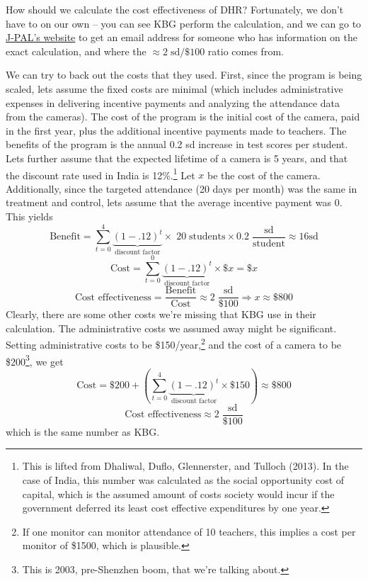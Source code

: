 \documentclass[12pt,english]{article}
\begin{document}
How should we calculate the cost effectiveness of DHR? Fortunately, we don't have to on our own -- you can see KBG perform the calculation, and we can go to \href{https://www.povertyactionlab.org/policy-lessons/cost-effectiveness}{J-PAL's website} to get an email address for someone who has information on the exact calculation, and where the $\approx 2\;\text{sd}/\$100$ ratio comes from.

We can try to back out the costs that they used. First, since the program is being scaled, lets assume the fixed costs are minimal (which includes administrative expenses in delivering incentive payments and analyzing the attendance data from the cameras). The cost of the program is the initial cost of the camera, paid in the first year, plus the additional incentive payments made to teachers. The benefits of the program is the annual 0.2 sd increase in test scores per student. Lets further assume that the expected lifetime of a camera is 5 years, and that the discount rate used in India is 12\%.\footnote{This is lifted from Dhaliwal, Duflo, Glennerster, and Tulloch (2013). In the case of India, this number was calculated as the social opportunity cost of capital, which is the assumed amount of costs society would incur if the government deferred its least cost effective expenditures by one year.} Let $x$ be the cost of the camera. Additionally, since the targeted attendance (20 days per month) was the same in treatment and control, lets assume that the average incentive payment was 0. This yields
$$ \text{Benefit} = \sum_{t = 0}^{4} \underbrace{(1 - .12)^{t} }_{\text{discount factor}} \times \; 20 \; \text{students} \times 0.2 \; \frac{\text{sd}}{\text{student}} \approx 16 \text{sd} $$
$$ \text{Cost} = \sum_{t = 0}^{0} \underbrace{(1 - .12)^{t} }_{\text{discount factor}} \times \$ x = \$ x $$
$$ \text{Cost effectiveness} = \frac{\text{Benefit}}{\text{Cost}} \approx 2 \; \frac{\text{sd}}{\$100} \Rightarrow x \approx \$ 800 $$
Clearly, there are some other costs we're missing that KBG use in their calculation. The administrative costs we assumed away might be significant. Setting administrative costs to be \$150/year,\footnote{If one monitor can monitor attendance of 10 teachers, this implies a cost per monitor of \$1500, which is plausible.} and the cost of a camera to be \$200\footnote{This is 2003, pre-Shenzhen boom, that we're talking about.}, we get
$$ \text{Cost} = \$ 200 + \left( \sum_{t = 0}^{4} \underbrace{(1 - .12)^{t} }_{\text{discount factor}} \times \$ 150 \right) \approx \$ 800 $$
$$ \text{Cost effectiveness} \approx 2 \; \frac{\text{sd}}{\$100} $$
which is the same number as KBG.
\end{document}
